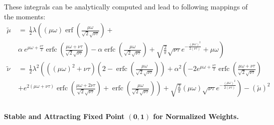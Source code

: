 \documentclass{article}
\newcommand\munn{{\tilde \mu}}
\newcommand\nunn{{\tilde \nu}}
\DeclareMathOperator{\erfc}{erfc}
\DeclareMathOperator{\erf}{erf}
\begin{document}
These integrals can be analytically computed and lead to following 
mappings of the moments: 
\begin{align}
\label{eq:mappingMean}
\munn\
  &= \ \frac{1}{2} \lambda  \left((\mu \omega)
    \erf  \left(\frac{\mu \omega}{\sqrt{2} \sqrt{\nu \tau}}\right)
    +\right. \\ \nonumber 
    &\left. \alpha \ e^{\mu \omega + \frac{\nu \tau}{2}} \erfc \left(\frac{\mu \omega + \nu \tau}{\sqrt{2} \sqrt{\nu \tau}}\right) - 
    \alpha  \erfc \left(\frac{\mu \omega}{\sqrt{2} \sqrt{\nu \tau }}\right) + \sqrt{\frac{2}{\pi }} 
    \sqrt{\nu \tau} e^{-\frac{(\mu \omega)^2}{2 (\nu \tau)}}+ \mu \omega \right) \\
\label{eq:mappingVar}
\nunn \ &= \ \frac{1}{2} \lambda ^2 \left(\left((\mu \omega)^2+\nu \tau \right)   \left(2 - \erfc  \left(\frac{\mu \omega}{\sqrt{2}
  \sqrt{\nu \tau}}\right) \right)+  \alpha ^2 \left(-2 e^{\mu \omega+\frac{\nu \tau}{2}} \erfc \left(\frac{\mu \omega+\nu \tau}{\sqrt{2} \sqrt{\nu \tau}}  \right) \right. \right.\\ \nonumber
 &\left. \left. + e ^{2 (\mu \omega+\nu \tau)} \erfc \left(\frac{\mu \omega+2 \nu \tau}{\sqrt{2} \sqrt{\nu \tau}}\right)+ \erfc \left(\frac{\mu \omega}{\sqrt{2} \sqrt{\nu \tau}}\right)\right)+\sqrt{\frac{2}{\pi }} (\mu \omega) \sqrt{\nu \tau} 
 e^{-\frac{(\mu \omega)^2}{2 (\nu \tau)}}\right)-  \left(\munn \right)^2 \\ \nonumber
\end{align}


\paragraph{Stable and Attracting Fixed Point $\bm{(0,1)}$ for Normalized Weights.}
\label{sec:perfect}
\end{document}
